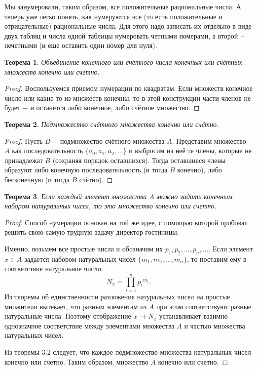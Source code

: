 \documentclass{article}
\newtheorem{theorem}{Теорема}[section]
\begin{document}
Мы занумеровали, таким образом, все положительные рациональные числа. А теперь уже легко понять, как нумеруются все (то есть положительные и отрицательные) рациональные числа. Для этого надо записать их отдельно в виде двух таблиц и числа одной таблицы нумеровать четными номерами, а второй \(-\) нечетными (и еще оставить один номер для нуля).

\begin{theorem}
Объединение конечного или счётного числа конечных или счётных множеств конечно или счётно.
\end{theorem}

\begin{proof}
Воспользуемся приемом нумерации по квадратам. Если множеств конечное число или какие-то из множеств конечны, то в этой конструкции части членов не будет \(-\) и останется либо конечное, либо счётное множество.
\end{proof}

\begin{theorem}
Подмножество счётного множества конечно или счётно.
\end{theorem}

\begin{proof}
Пусть \(B\) \(-\) подмножество счётного множества \(A\). Представим множество \(A\) как последовательность \(\{a_0, a_1, a_2, ...\}\) и выбросим из неё те члены, которые не принадлежат \(B\) (сохраняя порядок оставшихся). Тогда оставшиеся члены образуют либо конечную последовательность (и тогда \(B\) конечно), либо бесконечную (и тогда \(B\) счётно).
\end{proof}

\begin{theorem}
Если каждый элемент множества \(A\) можно задать конечным набором натуральных чисел, то это множество конечно или счетно.
\end{theorem}

\begin{proof}
Способ нумерации основан на той же идее, с помощью которой пробовал решить свою самую трудную задачу директор гостиницы.

Именно, возьмем все простые числа и обозначим их \(p_1, p_2, ..., p_n, ...\). Если элемент \(x \in A\) задается набором натуральных чисел \(\{m_1, m_2, ..., m_n\}\), то поставим ему в соответствие натуральное число
\[
N_x = \prod_{i=1}^{n} {p_i}^{m_i}.
\]
Из теоремы об единственности разложения натуральных чисел на простые множители вытекает, что разным элементам из \(A\) при этом соответствуют разные натуральные числа. Поэтому отображение \(x \to N_x\) устанавливает взаимно однозначное соответствие между элементами множества \(A\) и частью множества натуральных чисел.

Из теоремы 3.2 следует, что каждое подмножество множества натуральных чисел конечно или счетно. Таким образом, множество \(A\) конечно или счетно.
\end{proof}
\end{document}
